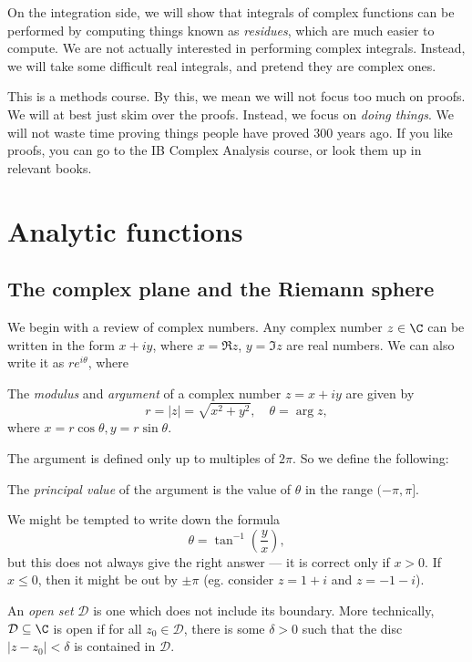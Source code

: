 \documentclass[a4paper]{article}
\begin{document}
On the integration side, we will show that integrals of complex functions can be performed by computing things known as \emph{residues}, which are much easier to compute. We are not actually interested in performing complex integrals. Instead, we will take some difficult real integrals, and pretend they are complex ones.

This is a methods course. By this, we mean we will not focus too much on proofs. We will at best just skim over the proofs. Instead, we focus on \emph{doing things}. We will not waste time proving things people have proved 300 years ago. If you like proofs, you can go to the IB Complex Analysis course, or look them up in relevant books.

\section{Analytic functions}
\subsection{The complex plane and the Riemann sphere}
We begin with a review of complex numbers. Any complex number $z \in \C$ can be written in the form $x + iy$, where $x = \Re z$, $y = \Im z$ are real numbers. We can also write it as $r e^{i\theta}$, where
\begin{defi}
  The \emph{modulus} and \emph{argument} of a complex number $z = x + iy$ are given by
  \[
    r = |z| = \sqrt{x^2 + y^2}, \quad \theta = \arg z,
  \]
  where $x = r \cos \theta, y = r \sin \theta$.
\end{defi}
The argument is defined only up to multiples of $2\pi$. So we define the following:
\begin{defi}
  The \emph{principal value} of the argument is the value of $\theta$ in the range $(-\pi, \pi]$.
\end{defi}
We might be tempted to write down the formula
\[
  \theta = \tan^{-1} \left(\frac{y}{x}\right),
\]
but this does not always give the right answer --- it is correct only if $x > 0$. If $x \leq 0$, then it might be out by $\pm \pi$ (eg. consider $z = 1 + i$ and $z = -1 - i$).

\begin{defi}
  An \emph{open set} $\mathcal{D}$ is one which does not include its boundary. More technically, $\mathcal{D} \subseteq \C$ is open if for all $z_0 \in \mathcal{D}$, there is some $\delta > 0$ such that the disc $|z - z_0| < \delta$ is contained in $\mathcal{D}$.
\end{defi}
\end{document}

